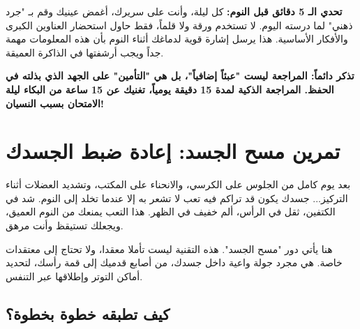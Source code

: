 \documentclass[12pt,a4paper]{book}
\newcommand{\importantAr}[1]{%
	\begin{important}
		\bfseries #1
	\end{important}
}
\begin{document}
	\begin{exercise}
		\textbf{تحدي الـ 5 دقائق قبل النوم:}
		كل ليلة، وأنت على سريرك، أغمض عينيك وقم بـ "جرد ذهني" لما درسته اليوم. لا تستخدم ورقة ولا قلماً، فقط حاول استحضار العناوين الكبرى والأفكار الأساسية. هذا يرسل إشارة قوية لدماغك أثناء النوم بأن هذه المعلومات مهمة جداً ويجب أرشفتها في الذاكرة العميقة.
	\end{exercise}
	
	\importantAr{تذكر دائماً: المراجعة ليست "عبئاً إضافياً"، بل هي "التأمين" على الجهد الذي بذلته في الحفظ. المراجعة الذكية لمدة 15 دقيقة يومياً، تغنيك عن 15 ساعة من البكاء ليلة الامتحان بسبب النسيان!}
	
	\section{تمرين مسح الجسد: إعادة ضبط الجسدك}
	\label{sec:body-scan}
	
	بعد يوم كامل من الجلوس على الكرسي، والانحناء على المكتب، وتشديد العضلات أثناء التركيز... جسدك يكون قد تراكم فيه تعب لا تشعر به إلا عندما تخلد إلى النوم. شد في الكتفين، ثقل في الرأس، ألم خفيف في الظهر. هذا التعب يمنعك من النوم العميق، ويجعلك تستيقظ وأنت مرهق.
	
	هنا يأتي دور "مسح الجسد". هذه التقنية ليست تأملا معقدا، ولا تحتاج إلى معتقدات خاصة. هي مجرد جولة واعية داخل جسدك، من أصابع قدميك إلى قمة رأسك، لتحديد أماكن التوتر وإطلاقها عبر التنفس.
	
	\subsection{كيف تطبقه خطوة بخطوة؟}
	
\end{document}
